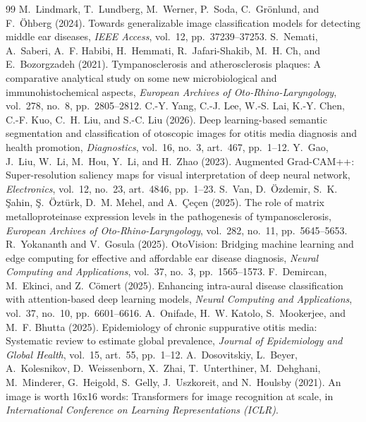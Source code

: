\documentclass[12pt,a4paper]{report}
\begin{document}
\begin{thebibliography}{99}
M.~Lindmark, T.~Lundberg, M.~Werner, P.~Soda, C.~Gr{\"o}nlund, and F.~{\"O}hberg (2024). Towards generalizable image classification models for detecting middle ear diseases, \textit{IEEE Access}, vol.~12, pp.~37239--37253.
S.~Nemati, A.~Saberi, A.~F. Habibi, H.~Hemmati, R.~Jafari-Shakib, M.~H. Ch, and E.~Bozorgzadeh (2021). Tympanosclerosis and atherosclerosis plaques: A comparative analytical study on some new microbiological and immunohistochemical aspects, \textit{European Archives of Oto-Rhino-Laryngology}, vol.~278, no.~8, pp.~2805--2812.
C.-Y. Yang, C.-J. Lee, W.-S. Lai, K.-Y. Chen, C.-F. Kuo, C.~H. Liu, and S.-C. Liu (2026). Deep learning-based semantic segmentation and classification of otoscopic images for otitis media diagnosis and health promotion, \textit{Diagnostics}, vol.~16, no.~3, art.~467, pp.~1--12.
Y.~Gao, J.~Liu, W.~Li, M.~Hou, Y.~Li, and H.~Zhao (2023). Augmented Grad-CAM++: Super-resolution saliency maps for visual interpretation of deep neural network, \textit{Electronics}, vol.~12, no.~23, art.~4846, pp.~1--23.
S.~Van, D.~{\"O}zdemir, S.~K. {\c{S}}ahin, {\c{S}}.~{\"O}zt{\"u}rk, D.~M. Mehel, and A.~{\c{C}}e{\c{c}}en (2025). The role of matrix metalloproteinase expression levels in the pathogenesis of tympanosclerosis, \textit{European Archives of Oto-Rhino-Laryngology}, vol.~282, no.~11, pp.~5645--5653.
R.~Yokananth and V.~Gosula (2025). OtoVision: Bridging machine learning and edge computing for effective and affordable ear disease diagnosis, \textit{Neural Computing and Applications}, vol.~37, no.~3, pp.~1565--1573.
F.~Demircan, M.~Ekinci, and Z.~C{\"o}mert (2025). Enhancing intra-aural disease classification with attention-based deep learning models, \textit{Neural Computing and Applications}, vol.~37, no.~10, pp.~6601--6616.
A.~Onifade, H.~W. Katolo, S.~Mookerjee, and M.~F. Bhutta (2025). Epidemiology of chronic suppurative otitis media: Systematic review to estimate global prevalence, \textit{Journal of Epidemiology and Global Health}, vol.~15, art.~55, pp.~1--12.
A.~Dosovitskiy, L.~Beyer, A.~Kolesnikov, D.~Weissenborn, X.~Zhai, T.~Unterthiner, M.~Dehghani, M.~Minderer, G.~Heigold, S.~Gelly, J.~Uszkoreit, and N.~Houlsby (2021). An image is worth 16x16 words: Transformers for image recognition at scale, in \textit{International Conference on Learning Representations (ICLR)}.

\end{thebibliography}
\end{document}
